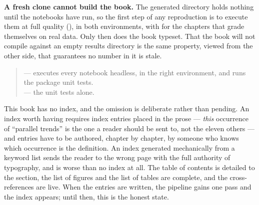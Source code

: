 \textbf{A fresh clone cannot build the book.} The generated directory holds nothing until the
notebooks have run, so the first step of any reproduction is to execute them at full quality
(), in both environments, with  for the chapters that grade
themselves on real data. Only then does the book typeset. That the book will not compile against an
empty results directory is the same property, viewed from the other side, that guarantees no number
in it is stale.

\begin{quote}\small
{} --- executes every notebook headless, in the right environment, and runs the
package unit tests.\\
 --- the unit tests alone.
\end{quote}

\begin{remark}
This book has no index, and the omission is deliberate rather than pending. An index worth having
requires index entries placed in the prose --- \emph{this} occurrence of ``parallel trends'' is the
one a reader should be sent to, not the eleven others --- and entries have to be authored, chapter
by chapter, by someone who knows which occurrence is the definition. An index generated
mechanically from a keyword list sends the reader to the wrong page with the full authority of
typography, and is worse than no index at all. The table of contents is detailed to the section, the
list of figures and the list of tables are complete, and the cross-references are live. When the
entries are written, the pipeline gains one pass and the index appears; until then, this is the
honest state.
\end{remark}
